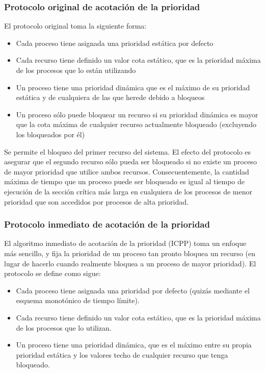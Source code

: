 \subsubsection{Protocolo original de acotación de la prioridad}

El protocolo original toma la siguiente forma:

\begin{itemize}
	\item Cada proceso tiene asignada una prioridad estática por defecto
	\item Cada recurso tiene definido un valor cota estático, que es la 
		prioridad máxima de los procesos que lo están utilizando
	\item Un proceso tiene una prioridad dinámica que es el máximo de su
		prioridad estática y de cualquiera de las que herede debido a
		bloqueos
	\item Un proceso sólo puede bloquear un recurso si su prioridad dinámica
		es mayor que la cota máxima de cualquier recurso actualmente
		bloqueado (excluyendo los bloqueados por él)
\end{itemize}

Se permite el bloqueo del primer recurso del sistema. El efecto del protocolo es
asegurar que el segundo recurso sólo pueda ser bloqueado si no existe un proceso
de mayor prioridad que utilice ambos recursos. Consecuentemente, la cantidad
máxima de tiempo que un proceso puede ser bloqueado es igual al tiempo de
ejecución de la sección crítica más larga en cualquiera de los procesos de menor
prioridad que son accedidos por procesos de alta prioridad.

\subsubsection{Protocolo inmediato de acotación de la prioridad}

El algoritmo inmediato de acotación de la prioridad (ICPP) toma un enfoque más
sencillo, y fija la prioridad de un proceso tan pronto bloquea un recurso (en
lugar de hacerlo cuando realmente bloquea a un proceso de mayor prioridad). El
protocolo se define como sigue:

\begin{itemize}
	\item Cada proceso tiene asignada una prioridad por defecto (quizás
		mediante el esquema monotónico de tiempo límite).
	\item Cada recurso tiene definido un valor cota estático, que es la
		prioridad máxima de los procesos que lo utilizan.
	\item Un proceso tiene una prioridad dinámica, que es el máximo entre su
		propia prioridad estática y los valores techo de cualquier
		recurso que tenga bloqueado.
\end{itemize}

